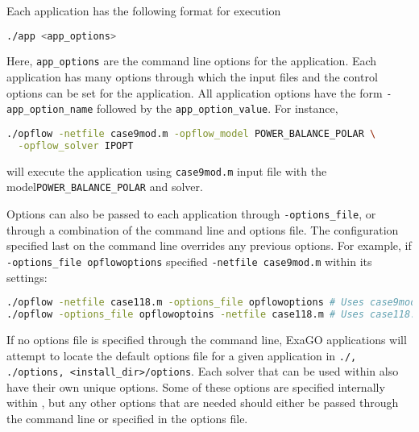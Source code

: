 Each \exago application has the following format for execution
\begin{lstlisting}[language=bash]
  ./app <app_options>
\end{lstlisting}
Here, \lstinline{app_options} are the command line options for the application. Each application has many options through which the input files and the control options can be set for the application. All application options have the form \lstinline{-app_option_name} followed by the \lstinline{app_option_value}. 
For instance,
\begin{lstlisting}[language=bash]
  ./opflow -netfile case9mod.m -opflow_model POWER_BALANCE_POLAR \
  -opflow_solver IPOPT
\end{lstlisting}
will execute the \opflow application using \lstinline{case9mod.m} input file
with the model\newline \lstinline{POWER_BALANCE_POLAR} and \ipopt solver.

Options can also be passed to each application through \lstinline{-options_file}, or through a combination of the command line and options file. The configuration specified last on the command line overrides any previous options. For example, if \lstinline{-options_file opflowoptions} specified \lstinline{-netfile case9mod.m} within its settings:
\begin{lstlisting}[language=bash]
./opflow -netfile case118.m -options_file opflowoptions # Uses case9mod.m
./opflow -options_file opflowoptoins -netfile case118.m # Uses case118.m
\end{lstlisting}
If no options file is specified through the command line, ExaGO applications will attempt to locate the default options file for a given application in \lstinline{./, ./options, <install_dir>/options}.
Each solver that can be used within \exago also have their own unique options. Some of these options are specified internally within \exago, but any other options that are needed should either be passed through the command line or specified in the options file.

